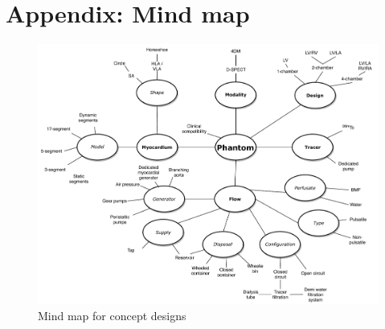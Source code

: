 
\chapter{Appendix: Mind map }
\label{app:mind_map}

\begin{figure} [H]
\includegraphics[width=\textwidth,height=\textheight,keepaspectratio]{./images/concept_diagram.pdf}
\caption{Mind map for concept designs}
\label{fig:mind_map}
\end{figure}

